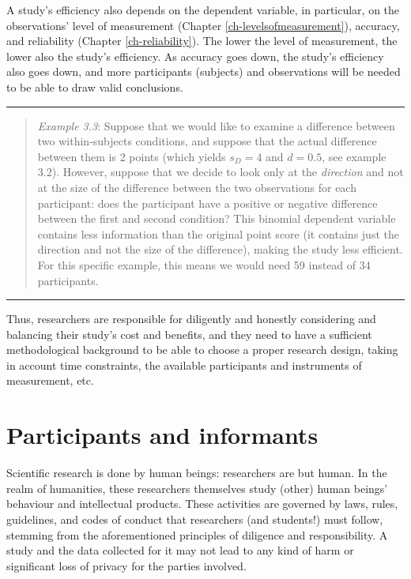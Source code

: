 \documentclass[
]{book}
\begin{document}
A study's efficiency also depends on the dependent variable, in particular, on the observations' level of measurement (Chapter \ref{ch-levelsofmeasurement}), accuracy, and reliability (Chapter \ref{ch-reliability}). The lower the level of measurement, the lower also the study's efficiency. As accuracy goes down, the study's efficiency also goes down, and more participants (subjects) and observations will be needed to be able to draw valid conclusions.

\begin{center}\rule{0.5\linewidth}{0.5pt}\end{center}

\begin{quote}
\emph{Example 3.3}: Suppose that we would like to examine a difference between two within-subjects conditions, and suppose that the actual difference between them is 2 points (which yields \(s_D = 4\) and \(d = 0.5\), see example 3.2). However, suppose that we decide to look only at the \emph{direction} and not at the size of the difference between the two observations for each participant: does the participant have a positive or negative difference between the first and second condition? This binomial dependent variable contains less information than the original point score (it contains just the direction and not the size of the difference), making the study less efficient. For this specific example, this means we would need 59 instead of 34 participants.
\end{quote}

\begin{center}\rule{0.5\linewidth}{0.5pt}\end{center}

Thus, researchers are responsible for diligently and honestly considering and balancing their study's cost and benefits, and they need to have a sufficient methodological background to be able to choose a proper research design, taking in account time constraints, the available participants and instruments of measurement, etc.

\hypertarget{participants-and-informants}{%
\section{Participants and informants}\label{participants-and-informants}}

Scientific research is done by human beings: researchers are but human. In the realm of humanities, these researchers themselves study (other) human beings' behaviour and intellectual products. These activities are governed by laws, rules, guidelines, and codes of conduct that researchers (and students!) must follow, stemming from the aforementioned principles of diligence and responsibility. A study and the data collected for it may not lead to any kind of harm or significant loss of privacy for the parties involved.
\end{document}
